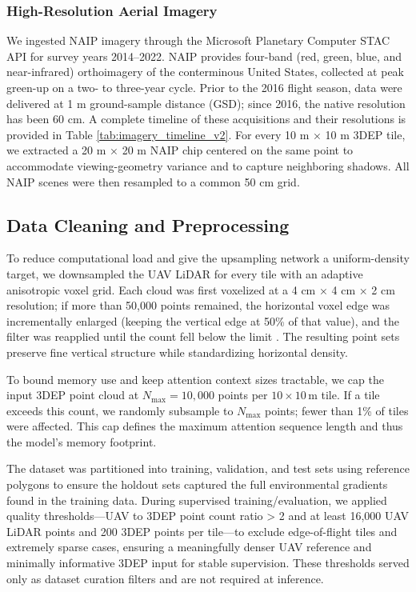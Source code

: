 \documentclass[remotesensing,article,accept,pdftex,moreauthors]{Definitions/mdpi}
\begin{document}
\subsubsection{High-Resolution Aerial Imagery}
We ingested NAIP imagery through the Microsoft Planetary Computer STAC API \citep{planetary_computer} for survey years 2014–2022. NAIP provides four-band (red, green, blue, and near-infrared) orthoimagery of the conterminous United States, collected at peak green-up on a two- to three-year cycle. Prior to the 2016 flight season, data were delivered at 1 m ground-sample distance (GSD); since 2016, the native resolution has been 60 cm. A complete timeline of these acquisitions and their resolutions is provided in Table \ref{tab:imagery_timeline_v2}. For every 10 m × 10 m 3DEP tile, we extracted a 20 m × 20 m NAIP chip centered on the same point to accommodate viewing-geometry variance and to capture neighboring shadows. All NAIP scenes were then resampled to a common 50 cm grid.



\subsection{Data Cleaning and Preprocessing}
To reduce computational load and give the upsampling network a uniform-density target, we downsampled the UAV LiDAR for every tile with an adaptive anisotropic voxel grid. Each cloud was first voxelized at a 4 cm × 4 cm × 2 cm resolution; if more than 50,000 points remained, the horizontal voxel edge was incrementally enlarged (keeping the vertical edge at 50\% of that value), and the filter was reapplied until the count fell below the limit
. The resulting point sets preserve fine vertical structure while standardizing horizontal density.

To bound memory use and keep attention context sizes tractable, we cap the input 3DEP point cloud at $N_{\max}=10{,}000$ points per $10\times10$\,m tile. If a tile exceeds this count, we randomly subsample to $N_{\max}$ points; fewer than 1\% of tiles were affected. This cap defines the maximum attention sequence length and thus the model's memory footprint.

The dataset was partitioned into training, validation, and test sets using reference polygons to ensure the holdout sets captured the full environmental gradients found in the training data. During supervised training/evaluation, we applied quality thresholds—UAV to 3DEP point count ratio > 2 and at least 16,000 UAV LiDAR points and 200 3DEP points per tile—to exclude edge-of-flight tiles and extremely sparse cases, ensuring a meaningfully denser UAV reference and minimally informative 3DEP input for stable supervision. These thresholds served only as dataset curation filters and are not required at inference.
\end{document}
